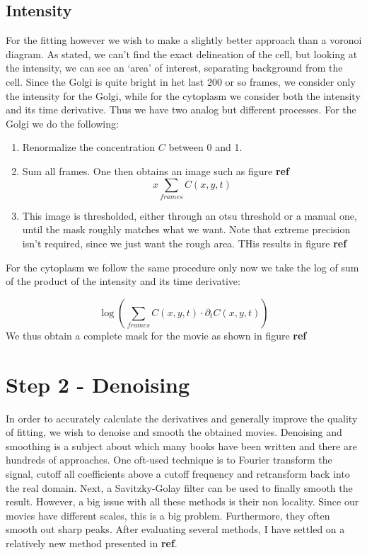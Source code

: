 \documentclass[12pt,a4paper,]{harvard-thesis}
\providecommand{\tightlist}{%
  \setlength{\itemsep}{0pt}\setlength{\parskip}{0pt}}
\begin{document}
\hypertarget{intensity}{%
\subsection{Intensity}\label{intensity}}

For the fitting however we wish to make a slightly better approach than
a voronoi diagram. As stated, we can't find the exact delineation of the
cell, but looking at the intensity, we can see an `area' of interest,
separating background from the cell. Since the Golgi is quite bright in
het last 200 or so frames, we consider only the intensity for the Golgi,
while for the cytoplasm we consider both the intensity and its time
derivative. Thus we have two analog but different processes. For the
Golgi we do the following:

\begin{enumerate}
\def\labelenumi{\arabic{enumi}.}
\tightlist
\item
  Renormalize the concentration \(C\) between 0 and 1.
\item
  Sum all frames. One then obtains an image such as figure \textbf{ref}
  \[x
  \sum_{frames}C(x,y,t)
  \]
\item
  This image is thresholded, either through an otsu threshold or a
  manual one, until the mask roughly matches what we want. Note that
  extreme precision isn't required, since we just want the rough area.
  THis results in figure \textbf{ref}
\end{enumerate}

For the cytoplasm we follow the same procedure only now we take the log
of sum of the product of the intensity and its time derivative:

\[
\log\left(\sum_{frames}C(x,y,t)\cdot\partial_tC(x,y,t)\right)
\] We thus obtain a complete mask for the movie as shown in figure
\textbf{ref}

\hypertarget{step-2---denoising}{%
\section{Step 2 - Denoising}\label{step-2---denoising}}

In order to accurately calculate the derivatives and generally improve
the quality of fitting, we wish to denoise and smooth the obtained
movies. Denoising and smoothing is a subject about which many books have
been written and there are hundreds of approaches. One oft-used
technique is to Fourier transform the signal, cutoff all coefficients
above a cutoff frequency and retransform back into the real domain.
Next, a Savitzky-Golay filter can be used to finally smooth the result.
However, a big issue with all these methods is their non locality. Since
our movies have different scales, this is a big problem. Furthermore,
they often smooth out sharp peaks. After evaluating several methods, I
have settled on a relatively new method presented in \textbf{ref}.
\end{document}
